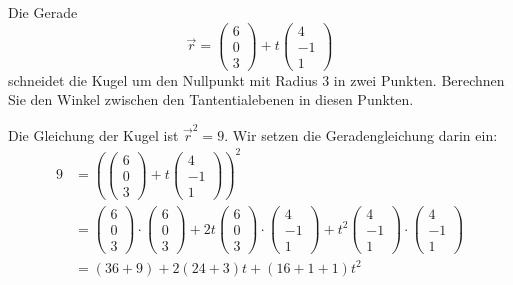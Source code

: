 Die Gerade
\[
\vec r
=
\begin{pmatrix}6\\0\\3\end{pmatrix}
+t
\begin{pmatrix}4\\-1\\1\end{pmatrix}
\]
schneidet die Kugel um den Nullpunkt mit Radius $3$ in zwei Punkten.
Berechnen Sie den Winkel zwischen den Tantentialebenen in diesen
Punkten.


\begin{loesung}
Die Gleichung der Kugel ist $\vec r^2=9$. Wir setzen die Geradengleichung
darin ein:
\begin{align*}
9&=\left(
\begin{pmatrix}6\\0\\3\end{pmatrix}+t\begin{pmatrix}4\\-1\\1\end{pmatrix}
\right)^2
\\
&=
\begin{pmatrix}6\\0\\3\end{pmatrix}
\cdot
\begin{pmatrix}6\\0\\3\end{pmatrix}
+2t
\begin{pmatrix}6\\0\\3\end{pmatrix}
\cdot
\begin{pmatrix}4\\-1\\1\end{pmatrix}
+t^2
\begin{pmatrix}4\\-1\\1\end{pmatrix}
\cdot
\begin{pmatrix}4\\-1\\1\end{pmatrix}
\\
&=(36+9)+2(24+3)t+(16+1+1)t^2\\

\end{align*}
\end{loesung}
